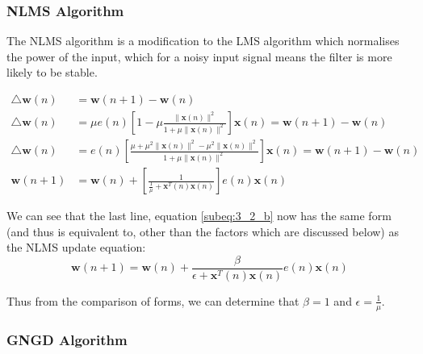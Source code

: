 \documentclass[./main.tex]{subfiles}
\begin{document}
\subsubsection{NLMS Algorithm}

The NLMS algorithm is a modification to the LMS algorithm which normalises the power of the input, which for a noisy input signal means the filter is more likely to be stable.

\begin{subequations}
	\begin{align}
	\bigtriangleup \mathbf{w}(n) &= \mathbf{w}(n+1) - \mathbf{w}(n) \\
	\bigtriangleup \mathbf{w}(n) &= \mu e(n) \left[  1 - \mu \frac{\lVert \mathbf{x}(n)\rVert^2}{1 + \mu \lVert \mathbf{x}(n)\rVert^2} \right] \mathbf{x}(n) = \mathbf{w}(n+1) - \mathbf{w}(n) \\
	\bigtriangleup \mathbf{w}(n) &= e(n) \left[ \frac{\mu + \mu^2  \lVert \mathbf{x}(n)\rVert^2 - \mu^2 \lVert \mathbf{x}(n)\rVert^2}{1 + \mu \lVert \mathbf{x}(n)\rVert^2} \right] \mathbf{x}(n) = \mathbf{w}(n+1) - \mathbf{w}(n) \\
	\mathbf{w}(n+1) &= \mathbf{w}(n) + \left[ \frac{1}{\frac{1}{\mu} + \mathbf{x}^T(n)\mathbf{x}(n) } \right] e(n) \mathbf{x}(n)  \label{subeq:3_2_b}
	\end{align}
\end{subequations}

We can see that the last line, equation \ref{subeq:3_2_b} now has the same form (and thus is equivalent to, other than the factors which are discussed below) as the NLMS update equation:
$$ \mathbf{w}(n+1) = \mathbf{w}(n) + \frac{\beta}{\epsilon + \mathbf{x}^T(n)\mathbf{x}(n)} e(n) \mathbf{x}(n) $$

Thus from the comparison of forms, we can determine that $ \beta = 1 $ and $ \epsilon = \frac{1}{\mu} $.

\subsubsection{GNGD Algorithm}




%  	
\end{document}
